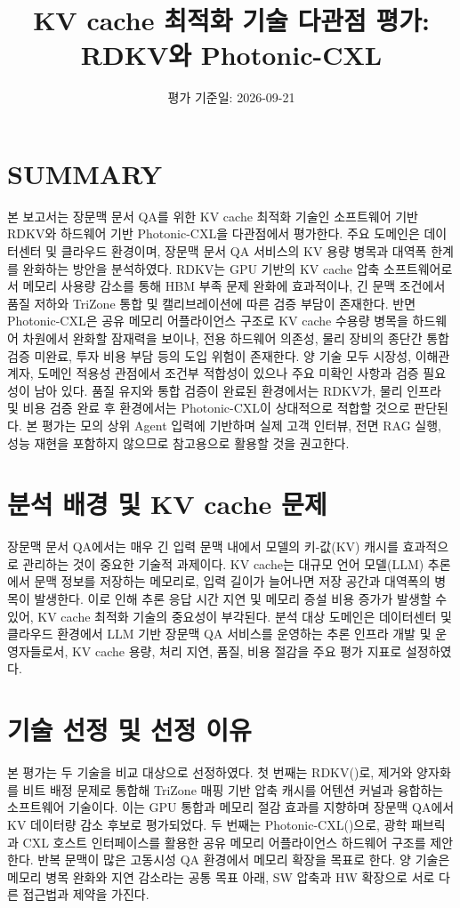 \documentclass[11pt,a4paper]{article}
\title{KV cache 최적화 기술 다관점 평가: RDKV와 Photonic-CXL}
\date{평가 기준일: 2026-09-21}
\begin{document}
\maketitle

\section{SUMMARY}
본 보고서는 장문맥 문서 QA를 위한 KV cache 최적화 기술인 소프트웨어 기반 RDKV와 하드웨어 기반 Photonic-CXL을 다관점에서 평가한다. 주요 도메인은 데이터센터 및 클라우드 환경이며, 장문맥 문서 QA 서비스의 KV 용량 병목과 대역폭 한계를 완화하는 방안을 분석하였다. RDKV는 GPU 기반의 KV cache 압축 소프트웨어로서 메모리 사용량 감소를 통해 HBM 부족 문제 완화에 효과적이나, 긴 문맥 조건에서 품질 저하와 TriZone 통합 및 캘리브레이션에 따른 검증 부담이 존재한다. 반면 Photonic-CXL은 공유 메모리 어플라이언스 구조로 KV cache 수용량 병목을 하드웨어 차원에서 완화할 잠재력을 보이나, 전용 하드웨어 의존성, 물리 장비의 종단간 통합 검증 미완료, 투자 비용 부담 등의 도입 위험이 존재한다. 양 기술 모두 시장성, 이해관계자, 도메인 적용성 관점에서 조건부 적합성이 있으나 주요 미확인 사항과 검증 필요성이 남아 있다. 품질 유지와 통합 검증이 완료된 환경에서는 RDKV가, 물리 인프라 및 비용 검증 완료 후 환경에서는 Photonic-CXL이 상대적으로 적합할 것으로 판단된다. 본 평가는 모의 상위 Agent 입력에 기반하며 실제 고객 인터뷰, 전면 RAG 실행, 성능 재현을 포함하지 않으므로 참고용으로 활용할 것을 권고한다.

\section{분석 배경 및 KV cache 문제}
장문맥 문서 QA에서는 매우 긴 입력 문맥 내에서 모델의 키-값(KV) 캐시를 효과적으로 관리하는 것이 중요한 기술적 과제이다. KV cache는 대규모 언어 모델(LLM) 추론에서 문맥 정보를 저장하는 메모리로, 입력 길이가 늘어나면 저장 공간과 대역폭의 병목이 발생한다. 이로 인해 추론 응답 시간 지연 및 메모리 증설 비용 증가가 발생할 수 있어, KV cache 최적화 기술의 중요성이 부각된다. 분석 대상 도메인은 데이터센터 및 클라우드 환경에서 LLM 기반 장문맥 QA 서비스를 운영하는 추론 인프라 개발 및 운영자들로서, KV cache 용량, 처리 지연, 품질, 비용 절감을 주요 평가 지표로 설정하였다.

\section{기술 선정 및 선정 이유}
본 평가는 두 기술을 비교 대상으로 선정하였다. 첫 번째는 RDKV(\cite{SW01_RDKV})로, 제거와 양자화를 비트 배정 문제로 통합해 TriZone 매핑 기반 압축 캐시를 어텐션 커널과 융합하는 소프트웨어 기술이다. 이는 GPU 통합과 메모리 절감 효과를 지향하며 장문맥 QA에서 KV 데이터량 감소 후보로 평가되었다. 두 번째는 Photonic-CXL(\cite{HW01_PHOTONIC_CXL})으로, 광학 패브릭과 CXL 호스트 인터페이스를 활용한 공유 메모리 어플라이언스 하드웨어 구조를 제안한다. 반복 문맥이 많은 고동시성 QA 환경에서 메모리 확장을 목표로 한다. 양 기술은 메모리 병목 완화와 지연 감소라는 공통 목표 아래, SW 압축과 HW 확장으로 서로 다른 접근법과 제약을 가진다.
\end{document}
